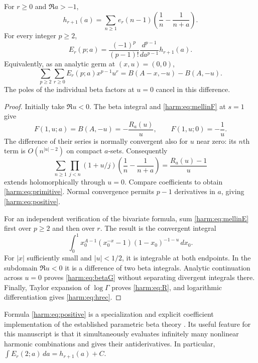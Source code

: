 \begin{theorem}
\label{harm:thm:beta}
For $r\geq0$ and $\Re a>-1$,
\begin{equation}\label{harm:eq:primitive}
 \boxed{\quad
 h_{r+1}(a)=\sum_{n\geq1}e_r(n-1)
           \left(\frac1n-\frac1{n+a}\right).
 \quad}
\end{equation}
For every integer $p\geq2$,
\begin{equation}\label{harm:eq:positive}
 \boxed{\quad
 E_r(p;a)=\frac{(-1)^p}{(p-1)!}
               \frac{d^{p-1}}{da^{p-1}}h_{r+1}(a).
 \quad}
\end{equation}
Equivalently, as an analytic germ at $(x,u)=(0,0)$,
\begin{equation}\label{harm:eq:betaG}
 \sum_{p\geq2}\sum_{r\geq0}E_r(p;a)x^{p-1}u^r
       =B(A-x,-u)-B(A,-u).
\end{equation}
The poles of the individual beta factors at $u=0$ cancel in this
difference.
\end{theorem}
\begin{proof}
Initially take $\Re u<0$.  The beta integral and
\eqref{harm:eq:mellinF} at $s=1$ give
\[
 F(1,u;a)=B(A,-u)=-\frac{R_a(u)}u,
 \qquad F(1,u;0)=-\frac1u.
\]
The difference of their series is normally convergent also for $u$
near zero: its $n$th term is $O(n^{|u|-2})$ on compact $a$-sets.
Consequently
\[
 \sum_{n\geq1}\prod_{j<n}(1+u/j)
       \left(\frac1n-\frac1{n+a}\right)
          =\frac{R_a(u)-1}{u}
\]
extends holomorphically through $u=0$.  Compare coefficients to
obtain \eqref{harm:eq:primitive}.  Normal convergence permits
$p-1$ derivatives in $a$, giving \eqref{harm:eq:positive}.

For an independent verification of the bivariate formula, sum
\eqref{harm:eq:mellinE} first over $p\geq2$ and then over $r$.
The result is the convergent integral
\[
 \int_0^1x_0^{A-1}(x_0^{-x}-1)(1-x_0)^{-1-u}\,dx_0.
\]
For $|x|$ sufficiently small and $|u|<1/2$, it is integrable at
both endpoints.  In the subdomain $\Re u<0$ it is a difference of
two beta integrals.  Analytic continuation across $u=0$ proves
\eqref{harm:eq:betaG} without separating divergent integrals there.
Finally, Taylor expansion of $\log\Gamma$ proves \eqref{harm:eq:R},
and logarithmic differentiation gives \eqref{harm:eq:hrec}.
\end{proof}

Formula \eqref{harm:eq:positive} is a specialization and explicit
coefficient implementation of the established parametric beta theory
\cite{Young2026}.  Its useful feature for this manuscript is that it
simultaneously evaluates infinitely many nonlinear harmonic combinations
and gives their antiderivatives.  In particular,
$\int E_r(2;a)\,da=h_{r+1}(a)+C$.

